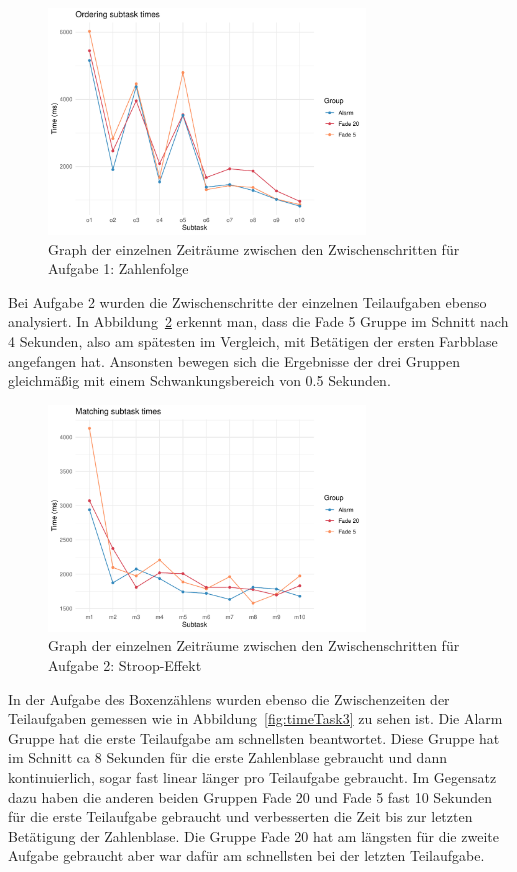 \begin{figure}[H]
	\centering
	\includegraphics[width=0.75\textwidth]{./_StudyResults/timeTask1}
	\caption{Graph der einzelnen Zeiträume zwischen den Zwischenschritten für Aufgabe 1: Zahlenfolge}
	\label{fig:timeTask1}
\end{figure}

Bei Aufgabe 2 wurden die Zwischenschritte der einzelnen Teilaufgaben ebenso analysiert. In Abbildung~\ref{fig:timeTask2} erkennt man, dass die Fade 5 Gruppe im Schnitt nach 4 Sekunden, also am spätesten im Vergleich, mit Betätigen der ersten Farbblase angefangen hat. Ansonsten bewegen sich die Ergebnisse der drei Gruppen gleichmäßig mit einem Schwankungsbereich von 0.5 Sekunden.

\begin{figure}[H]
	\centering
	\includegraphics[width=0.75\textwidth]{./_StudyResults/timeTask2}
	\caption{Graph der einzelnen Zeiträume zwischen den Zwischenschritten für Aufgabe 2: Stroop-Effekt}
	\label{fig:timeTask2}
\end{figure}

In der Aufgabe des Boxenzählens wurden ebenso die Zwischenzeiten der Teilaufgaben gemessen wie in Abbildung~\ref{fig:timeTask3} zu sehen ist. Die Alarm Gruppe hat die erste Teilaufgabe am schnellsten beantwortet. Diese Gruppe hat im Schnitt ca 8 Sekunden für die erste Zahlenblase gebraucht und dann kontinuierlich, sogar fast linear länger pro Teilaufgabe gebraucht. Im Gegensatz dazu haben die anderen beiden Gruppen Fade 20 und Fade 5 fast 10 Sekunden für die erste Teilaufgabe gebraucht und verbesserten die Zeit bis zur letzten Betätigung der Zahlenblase. Die Gruppe Fade 20 hat am längsten für die zweite Aufgabe gebraucht aber war dafür am schnellsten bei der letzten Teilaufgabe.

